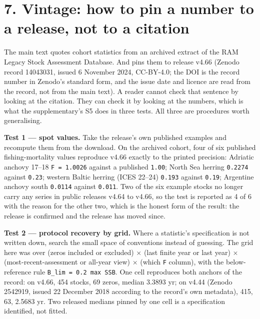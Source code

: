\documentclass[11pt]{article}
\begin{document}
\vspace{0.8em}

\section*{7. Vintage: how to pin a number to a release, not to a citation}\label{7-vintage-how-to-pin-a-number-to-a-release-not-to-a-citation}

The main text quotes cohort statistics from an archived extract of the RAM Legacy Stock Assessment Database. And pins them to release v4.66 (Zenodo record 14043031, issued 6 November 2024, CC-BY-4.0; the DOI is the record number in Zenodo's standard form, and the issue date and licence are read from the record, not from the main text). A reader cannot check that sentence by looking at the citation. They can check it by looking at the numbers, which is what the supplementary's S5 does in three tests. All three are procedures worth generalising.

\textbf{Test 1 --- spot values.} Take the release's own published examples and recompute them from the download. On the archived cohort, four of six published fishing-mortality values reproduce v4.66 exactly to the printed precision: Adriatic anchovy 17--18 \texttt{F = 1.\allowbreak{}0026} against a published \texttt{1.\allowbreak{}00}; North Sea herring \texttt{0.\allowbreak{}2274} against \texttt{0.\allowbreak{}23}; western Baltic herring (ICES 22--24) \texttt{0.\allowbreak{}193} against \texttt{0.\allowbreak{}19}; Argentine anchovy south \texttt{0.\allowbreak{}0114} against \texttt{0.\allowbreak{}011}. Two of the six example stocks no longer carry any series in public releases v4.64 to v4.66, so the test is reported as 4 of 6 with the reason for the other two, which is the honest form of the result: the release is confirmed and the release has moved since.

\textbf{Test 2 --- protocol recovery by grid.} Where a statistic's specification is not written down, search the small space of conventions instead of guessing. The grid here was over (zeros included or excluded) \ensuremath{\times} (last finite year or last year) \ensuremath{\times} (most-recent-assessment or all-year view) \ensuremath{\times} (which \texttt{F} column), with the below- reference rule \texttt{B\_lim = 0.\allowbreak{}2 max SSB}. One cell reproduces both anchors of the record: on v4.66, 454 stocks, 69 zeros, median 3.3893 yr; on v4.44 (Zenodo 2542919, issued 22 December 2018 according to the record's own metadata), 415, 63, 2.5683 yr. Two released medians pinned by one cell is a specification identified, not fitted.
\end{document}
